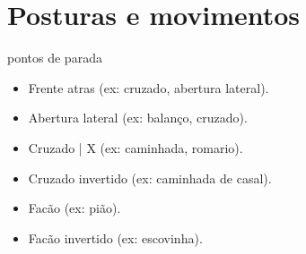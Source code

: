 \chapter{Posturas e movimentos}

pontos de parada
\begin{itemize}
\item Frente atras (ex: cruzado, abertura lateral).
\item Abertura lateral (ex: balanço, cruzado).
\item Cruzado | X (ex: caminhada, romario).
\item Cruzado invertido (ex: caminhada de casal).
\item Facão (ex: pião).
\item Facão invertido (ex: escovinha).
\end{itemize}
